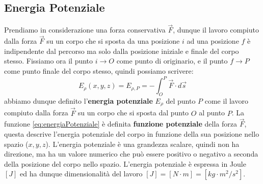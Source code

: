         \subsection{Energia Potenziale}
            \label{subsec:energiaPotenziale}
            Prendiamo in considerazione una forza conservativa $\vec{F}$, dunque il lavoro compiuto dalla forza $\vec{F}$ su un corpo che si sposta da una posizione $i$ ad una posizione $f$ è indipendente dal percorso ma solo dalla posizione iniziale e finale del corpo stesso. Fissiamo ora il punto $i\rightarrow O$ come punto di originario, e il punto $f\rightarrow P$ come punto finale del corpo stesso, quindi possiamo scrivere:
            \begin{equation}
                E_{\rho}(x,y,z)=E_{\rho,P}=-\int_{O}^{P} \vec{F}\cdot d\vec{s} \label{eq:energiaPotenziale}
            \end{equation}
            abbiamo dunque definito l'\textbf{energia potenziale} $E_{\rho}$ del punto $P$ come il lavoro compiuto dalla forza $\vec{F}$ su un corpo che si sposta dal punto $O$ al punto $P$. La funzione \ref{eq:energiaPotenziale} è definita \textbf{funzione potenziale} della forza $\vec{F}$, questa descrive l'energia potenziale del corpo in funzione della sua posizione nello spazio ($x,y,z$). L'energia potenziale è una grandezza scalare, quindi non ha direzione, ma ha un valore numerico che può essere positivo o negativo a seconda della posizione del corpo nello spazio. L'energia potenziale è espressa in Joule $[J]$ ed ha dunque dimensionalità del lavoro $[J] = [N\cdot m] = [kg\cdot m^2/s^2]$.
